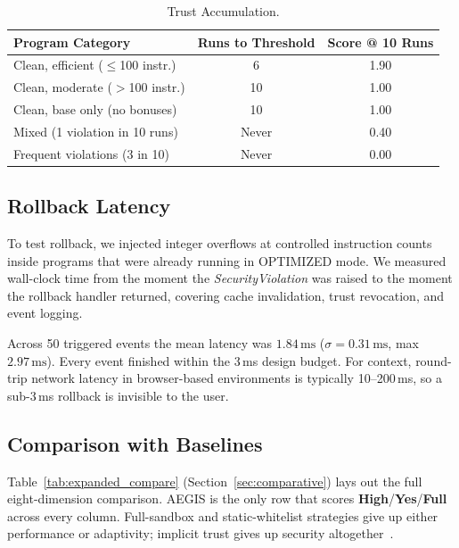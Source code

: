 \documentclass[conference]{IEEEtran}
\begin{document}
\begin{table}[t]
\caption{Trust Accumulation.}
\label{tab:trust}
\centering
\renewcommand{\arraystretch}{1.18}
\small
\begin{tabular}{@{} p{3.0cm} c c @{}}
\toprule
\textbf{Program Category} & \textbf{Runs to Threshold} &
\textbf{Score @ 10 Runs} \\
\midrule
Clean, efficient ($\leq$100 instr.)    & 6 & 1.90 \\
Clean, moderate ($>$100 instr.)        & 10 & 1.00 \\
Clean, base only (no bonuses)          & 10 & 1.00 \\
Mixed (1 violation in 10 runs)         & Never & 0.40 \\
Frequent violations (3 in 10)          & Never & 0.00 \\
\bottomrule
\end{tabular}
\end{table}

\subsection{Rollback Latency}

To test rollback, we injected integer overflows at controlled
instruction counts inside programs that were already running in
OPTIMIZED mode.  We measured wall-clock time from the moment the
\textit{SecurityViolation} was raised to the moment the rollback
handler returned, covering cache invalidation, trust revocation,
and event logging.

Across 50 triggered events the mean latency was
$1.84\,\text{ms}$ ($\sigma = 0.31\,\text{ms}$, max
$2.97\,\text{ms}$).  Every event finished within the 3\,ms
design budget.  For context, round-trip network latency in
browser-based environments is typically 10--200\,ms, so a
sub-3\,ms rollback is invisible to the user.

\subsection{Comparison with Baselines}

Table~\ref{tab:expanded_compare} (Section~\ref{sec:comparative})
lays out the full eight-dimension comparison.  AEGIS is the only
row that scores \textbf{High}/\textbf{Yes}/\textbf{Full} across
every column.  Full-sandbox and static-whitelist strategies give
up either performance or adaptivity; implicit trust gives up
security
altogether~\cite{wang2022trust,ullah2024deeptrust}.
\end{document}
